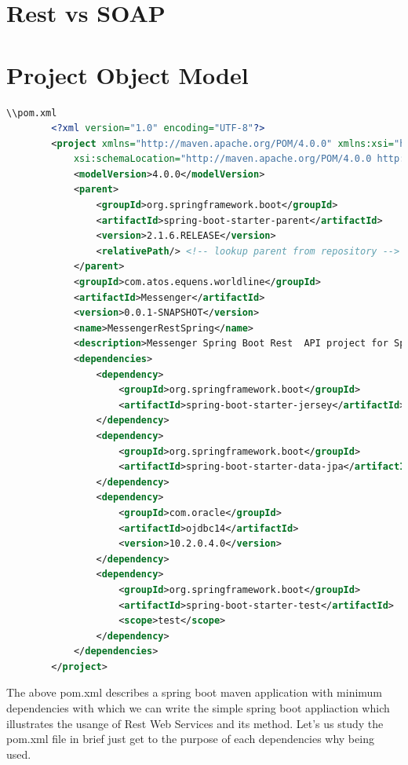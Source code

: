 \documentclass{report}
\begin{document}
	\section{Rest vs SOAP}
	\newpage
	\section{Project Object Model}	
	
	\begin{lstlisting}[language = xml]
	\\pom.xml
		<?xml version="1.0" encoding="UTF-8"?>
		<project xmlns="http://maven.apache.org/POM/4.0.0" xmlns:xsi="http://www.w3.org/2001/XMLSchema-instance"
			xsi:schemaLocation="http://maven.apache.org/POM/4.0.0 http://maven.apache.org/xsd/maven-4.0.0.xsd">
			<modelVersion>4.0.0</modelVersion>
			<parent>
				<groupId>org.springframework.boot</groupId>
				<artifactId>spring-boot-starter-parent</artifactId>
				<version>2.1.6.RELEASE</version>
				<relativePath/> <!-- lookup parent from repository -->
			</parent>
			<groupId>com.atos.equens.worldline</groupId>
			<artifactId>Messenger</artifactId>
			<version>0.0.1-SNAPSHOT</version>
			<name>MessengerRestSpring</name>
			<description>Messenger Spring Boot Rest  API project for Spring Boot</description>
			<dependencies>
				<dependency>
					<groupId>org.springframework.boot</groupId>
					<artifactId>spring-boot-starter-jersey</artifactId>
				</dependency>
				<dependency>
					<groupId>org.springframework.boot</groupId>
					<artifactId>spring-boot-starter-data-jpa</artifactId>
				</dependency>
				<dependency>
					<groupId>com.oracle</groupId>
					<artifactId>ojdbc14</artifactId>
					<version>10.2.0.4.0</version>
				</dependency>
				<dependency>
					<groupId>org.springframework.boot</groupId>
					<artifactId>spring-boot-starter-test</artifactId>
					<scope>test</scope>
				</dependency>
			</dependencies>
		</project>
	\end{lstlisting}
	The above pom.xml describes a spring boot maven application with minimum dependencies with which we can write the simple spring boot appliaction which illustrates the usange of Rest Web Services and its method.
	Let’s us study the pom.xml file in brief just get to the purpose of each dependencies why being used.
\end{document}
